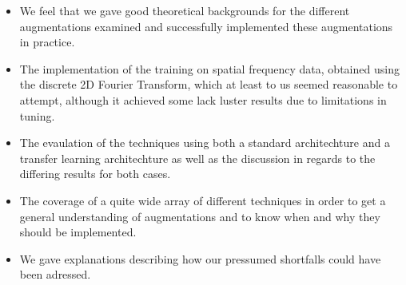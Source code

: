 \documentclass{article}
\begin{document}
\begin{itemize}
 \item We feel that we gave good theoretical backgrounds for the different augmentations examined and successfully implemented these augmentations in practice. 
 \item The implementation of the training on spatial frequency data, obtained using the discrete 2D Fourier Transform, which at least to us seemed reasonable to attempt, although it achieved some lack luster results due to limitations in tuning.
 \item The evaulation of the techniques using both a standard architechture and a transfer learning architechture as well as the discussion in regards to the differing results for both cases.
 \item The coverage of a quite wide array of different techniques in order to get a general understanding of augmentations and to know when and why they should be implemented.
 \item We gave explanations describing how our pressumed shortfalls could have been adressed.
\end{itemize}
\end{document}
